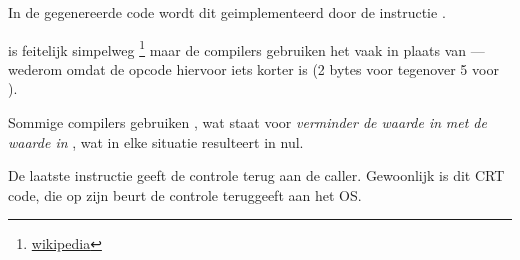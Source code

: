 In de gegenereerde code wordt dit geimplementeerd door de instructie .


\XOR is feitelijk simpelweg \footnote{\href{http://en.wikipedia.org/wiki/Exclusive_or}{wikipedia}} maar de compilers gebruiken het vaak in plaats van
 --- wederom omdat de opcode hiervoor iets korter is (2 bytes voor \XOR tegenover 5 voor \MOV).

Sommige compilers gebruiken , wat staat voor \emph{verminder de waarde in} \EAX \emph{met de waarde in} \EAX, wat in elke situatie resulteert in nul.

De laatste instructie \RET geeft de controle terug aan de \gls{caller}. Gewoonlijk is dit \CCpp \ac{CRT} code, die op zijn beurt de controle teruggeeft aan het \ac{OS}.

